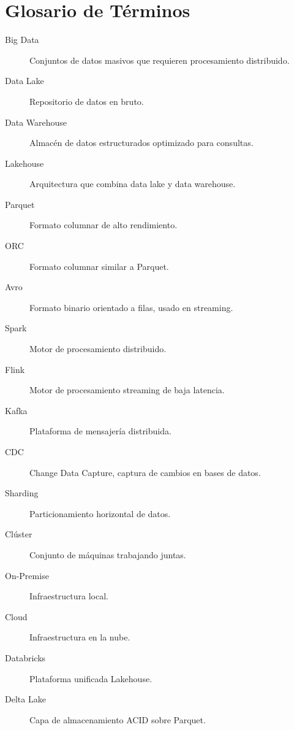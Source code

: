 \documentclass[12pt,a4paper,openany,oneside]{book}
\begin{document}
\chapter{Glosario de Términos}
\begin{description}
    \item[Big Data] Conjuntos de datos masivos que requieren procesamiento distribuido.
    \item[Data Lake] Repositorio de datos en bruto.
    \item[Data Warehouse] Almacén de datos estructurados optimizado para consultas.
    \item[Lakehouse] Arquitectura que combina data lake y data warehouse.
    \item[Parquet] Formato columnar de alto rendimiento.
    \item[ORC] Formato columnar similar a Parquet.
    \item[Avro] Formato binario orientado a filas, usado en streaming.
    \item[Spark] Motor de procesamiento distribuido.
    \item[Flink] Motor de procesamiento streaming de baja latencia.
    \item[Kafka] Plataforma de mensajería distribuida.
    \item[CDC] Change Data Capture, captura de cambios en bases de datos.
    \item[Sharding] Particionamiento horizontal de datos.
    \item[Clúster] Conjunto de máquinas trabajando juntas.
    \item[On-Premise] Infraestructura local.
    \item[Cloud] Infraestructura en la nube.
    \item[Databricks] Plataforma unificada Lakehouse.
    \item[Delta Lake] Capa de almacenamiento ACID sobre Parquet.
\end{description}
\end{document}
